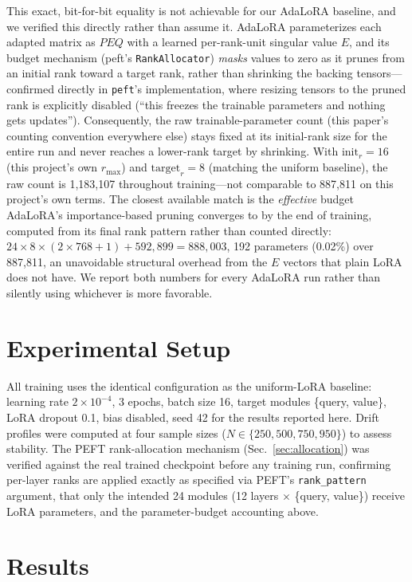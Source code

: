 \documentclass[conference]{IEEEtran}
\begin{document}
This exact, bit-for-bit equality is not achievable for our AdaLoRA baseline, and we verified this directly rather than assume it. AdaLoRA \cite{zhang2023adalora} parameterizes each adapted matrix as $P E Q$ with a learned per-rank-unit singular value $E$, and its budget mechanism (peft's \texttt{RankAllocator}) \emph{masks} values to zero as it prunes from an initial rank toward a target rank, rather than shrinking the backing tensors---confirmed directly in \texttt{peft}'s implementation, where resizing tensors to the pruned rank is explicitly disabled (``this freezes the trainable parameters and nothing gets updates''). Consequently, the raw trainable-parameter count (this paper's counting convention everywhere else) stays fixed at its initial-rank size for the entire run and never reaches a lower-rank target by shrinking. With $\mathrm{init}_r=16$ (this project's own $r_{\max}$) and $\mathrm{target}_r=8$ (matching the uniform baseline), the raw count is 1{,}183{,}107 throughout training---not comparable to 887{,}811 on this project's own terms. The closest available match is the \emph{effective} budget AdaLoRA's importance-based pruning converges to by the end of training, computed from its final rank pattern rather than counted directly: $24 \times 8 \times (2\times768+1) + 592{,}899 = 888{,}003$, 192 parameters (0.02\%) over 887{,}811, an unavoidable structural overhead from the $E$ vectors that plain LoRA does not have. We report both numbers for every AdaLoRA run rather than silently using whichever is more favorable.

\section{Experimental Setup}

All training uses the identical configuration as the uniform-LoRA baseline: learning rate $2\times10^{-4}$, 3 epochs, batch size 16, target modules \{query, value\}, LoRA dropout 0.1, bias disabled, seed 42 for the results reported here. Drift profiles were computed at four sample sizes ($N \in \{250, 500, 750, 950\}$) to assess stability. The PEFT rank-allocation mechanism (Sec.~\ref{sec:allocation}) was verified against the real trained checkpoint before any training run, confirming per-layer ranks are applied exactly as specified via PEFT's \texttt{rank\_pattern} argument, that only the intended 24 modules (12 layers $\times$ \{query, value\}) receive LoRA parameters, and the parameter-budget accounting above.

\section{Results}
\label{sec:results}
\end{document}
